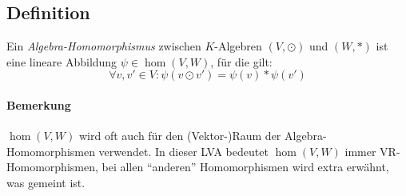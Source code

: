\subsection{Definition}
	\begin{Definition}
		Ein \emph{Algebra-Homomorphismus} zwischen $ K $-Algebren $ (V,\odot) $ und $ (W,*) $ ist eine lineare Abbildung $ \psi\in \hom(V,W) $, für die gilt:
		\[ \forall v,v' \in V: \psi(v\odot v')=\psi(v)*\psi(v') \]
	\end{Definition}
\paragraph{Bemerkung}
	$ \hom(V,W) $ wird oft auch für den (Vektor-)Raum der Algebra-Homomorphismen verwendet. In dieser LVA bedeutet $ \hom(V,W) $ immer VR-Homomorphismen, bei allen "`anderen"' Homomorphismen wird extra erwähnt, was gemeint ist.

